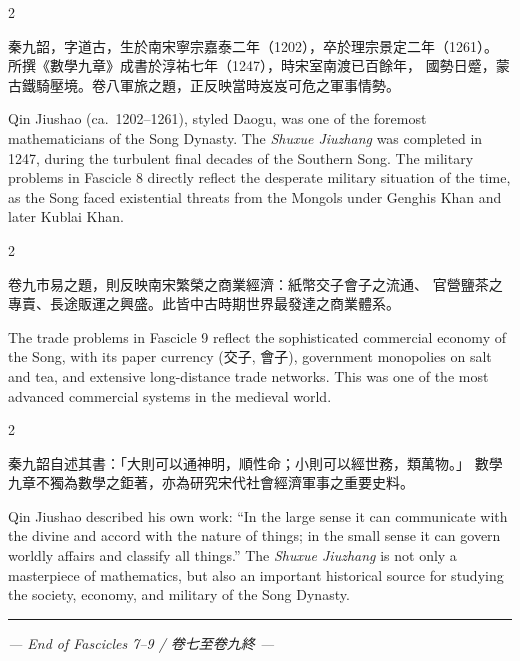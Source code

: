 \documentclass[11pt,a4paper]{article}
\newcommand{\longline}{\noindent\rule{\textwidth}{0.4pt}}
\begin{document}
\begin{paracol}{2}

秦九韶，字道古，生於南宋寧宗嘉泰二年（1202），卒於理宗景定二年（1261）。
所撰《數學九章》成書於淳祐七年（1247），時宋室南渡已百餘年，
國勢日蹙，蒙古鐵騎壓境。卷八軍旅之題，正反映當時岌岌可危之軍事情勢。

\switchcolumn

Qin Jiushao (ca.~1202--1261), styled Daogu, was one of the foremost
mathematicians of the Song Dynasty. The \textit{Shuxue Jiuzhang} was
completed in 1247, during the turbulent final decades of the Southern Song.
The military problems in Fascicle 8 directly reflect the desperate military
situation of the time, as the Song faced existential threats from the Mongols
under Genghis Khan and later Kublai Khan.

\end{paracol}

\vspace{0.5em}

\begin{paracol}{2}

卷九市易之題，則反映南宋繁榮之商業經濟：紙幣交子會子之流通、
官營鹽茶之專賣、長途販運之興盛。此皆中古時期世界最發達之商業體系。

\switchcolumn

The trade problems in Fascicle 9 reflect the sophisticated commercial economy
of the Song, with its paper currency (交子, 會子), government monopolies on
salt and tea, and extensive long-distance trade networks. This was one of the
most advanced commercial systems in the medieval world.

\end{paracol}

\vspace{0.5em}

\begin{paracol}{2}

秦九韶自述其書：「大則可以通神明，順性命；小則可以經世務，類萬物。」
數學九章不獨為數學之鉅著，亦為研究宋代社會經濟軍事之重要史料。

\switchcolumn

Qin Jiushao described his own work: ``In the large sense it can communicate
with the divine and accord with the nature of things; in the small sense it
can govern worldly affairs and classify all things.'' The \textit{Shuxue
Jiuzhang} is not only a masterpiece of mathematics, but also an
important historical source for studying the society, economy, and military
of the Song Dynasty.

\end{paracol}

\vspace{2em}
\begin{center}
\longline
\vspace{1em}
{\small\color{sectioncolor}
\textit{--- End of Fascicles 7--9 / 卷七至卷九終 ---}
}
\end{center}
\end{document}
